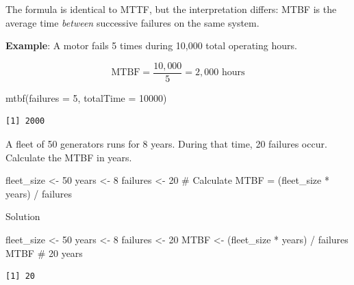 \documentclass[
  letterpaper,
  DIV=11,
  numbers=noendperiod]{scrreprt}
\newenvironment{Shaded}{\begin{snugshade}}{\end{snugshade}}
\newcommand{\AttributeTok}[1]{\textcolor[rgb]{0.40,0.45,0.13}{#1}}
\newcommand{\CommentTok}[1]{\textcolor[rgb]{0.37,0.37,0.37}{#1}}
\newcommand{\DecValTok}[1]{\textcolor[rgb]{0.68,0.00,0.00}{#1}}
\newcommand{\FunctionTok}[1]{\textcolor[rgb]{0.28,0.35,0.67}{#1}}
\newcommand{\NormalTok}[1]{\textcolor[rgb]{0.00,0.23,0.31}{#1}}
\newcommand{\OtherTok}[1]{\textcolor[rgb]{0.00,0.23,0.31}{#1}}
\newcommand{\SpecialCharTok}[1]{\textcolor[rgb]{0.37,0.37,0.37}{#1}}
\begin{document}
The formula is identical to MTTF, but the interpretation differs: MTBF
is the average time \emph{between} successive failures on the same
system.

\textbf{Example}: A motor fails 5 times during 10,000 total operating
hours.

\[\text{MTBF} = \frac{10{,}000}{5} = 2{,}000 \text{ hours}\]

\begin{Shaded}
\begin{Highlighting}[]
\FunctionTok{mtbf}\NormalTok{(}\AttributeTok{failures =} \DecValTok{5}\NormalTok{, }\AttributeTok{totalTime =} \DecValTok{10000}\NormalTok{)}
\end{Highlighting}
\end{Shaded}

\begin{verbatim}
[1] 2000
\end{verbatim}

\begin{tcolorbox}[enhanced jigsaw, arc=.35mm, bottomrule=.15mm, bottomtitle=1mm, breakable, colback=white, colbacktitle=quarto-callout-note-color!10!white, colframe=quarto-callout-note-color-frame, coltitle=black, left=2mm, leftrule=.75mm, opacityback=0, opacitybacktitle=0.6, rightrule=.15mm, title=\textcolor{quarto-callout-note-color}{\faInfo}\hspace{0.5em}{Try It}, titlerule=0mm, toprule=.15mm, toptitle=1mm]

A fleet of 50 generators runs for 8 years. During that time, 20 failures
occur. Calculate the MTBF in years.

\begin{Shaded}
\begin{Highlighting}[]
\NormalTok{fleet\_size }\OtherTok{\textless{}{-}} \DecValTok{50}
\NormalTok{years      }\OtherTok{\textless{}{-}} \DecValTok{8}
\NormalTok{failures   }\OtherTok{\textless{}{-}} \DecValTok{20}
\CommentTok{\# Calculate MTBF = (fleet\_size * years) / failures}
\end{Highlighting}
\end{Shaded}

Solution

\begin{Shaded}
\begin{Highlighting}[]
\NormalTok{fleet\_size }\OtherTok{\textless{}{-}} \DecValTok{50}
\NormalTok{years      }\OtherTok{\textless{}{-}} \DecValTok{8}
\NormalTok{failures   }\OtherTok{\textless{}{-}} \DecValTok{20}
\NormalTok{MTBF }\OtherTok{\textless{}{-}}\NormalTok{ (fleet\_size }\SpecialCharTok{*}\NormalTok{ years) }\SpecialCharTok{/}\NormalTok{ failures}
\NormalTok{MTBF  }\CommentTok{\# 20 years}
\end{Highlighting}
\end{Shaded}

\begin{verbatim}
[1] 20
\end{verbatim}

\end{tcolorbox}
\end{document}
